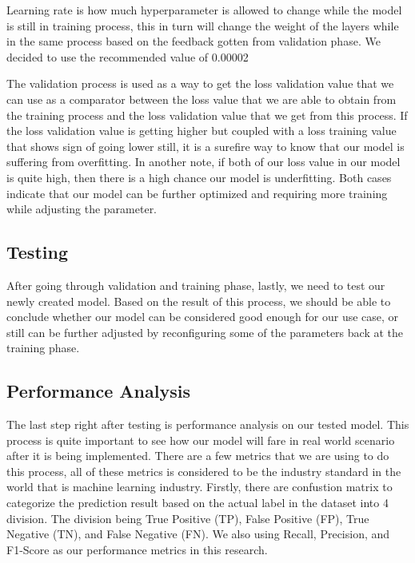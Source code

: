 Learning rate is how much hyperparameter is allowed to change while the model is still in training process, this in turn will change the weight of the layers while in the same process based on the feedback gotten from validation phase. We decided to use the recommended value of 0.00002 \cite{koto2020indolem}

The validation process is used as a way to get the loss validation value that we can use as a comparator between the loss value that we are able to obtain from the training process and the loss validation value that we get from this process. If the loss validation value is getting higher but coupled with a loss training value that shows sign of going lower still, it is a surefire way to know that our model is suffering from overfitting. In another note, if both of our loss value in our model is quite high, then there is a high chance our model is underfitting. Both cases indicate that our model can be further optimized and requiring more training while adjusting the parameter.

\subsection{Testing}

After going through validation and training phase, lastly, we need to test our newly created model. Based on the result of this process, we should be able to conclude whether our model can be considered good enough for our use case, or still can be further adjusted by reconfiguring some of the parameters back at the training phase.

\subsection{Performance Analysis}

The last step right after testing is performance analysis on our tested model. This process is quite important to see how our model will fare in real world scenario after it is being implemented. There are a few metrics that we are using to do this process, all of these metrics is considered to be the industry standard in the world that is machine learning industry. Firstly, there are confustion matrix to categorize the prediction result based on the actual label in the dataset into 4 division. The division being True Positive (TP), False Positive (FP), True Negative (TN), and False Negative (FN). We also using Recall, Precision, and F1-Score as our performance metrics in this research.